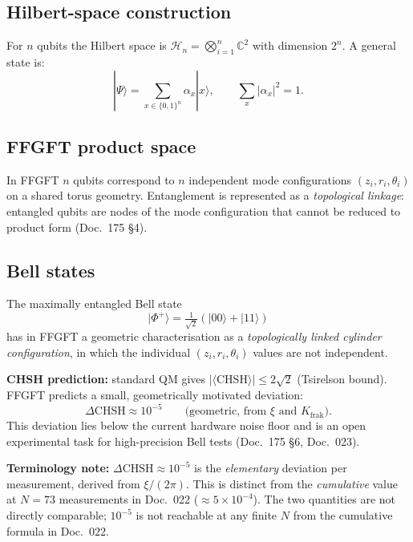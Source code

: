 \subsection{Hilbert-space construction}

For $n$ qubits the Hilbert space is
$\mathcal{H}_n = \bigotimes_{i=1}^{n} \mathbb{C}^2$ with dimension
$2^n$. A general state is:
\begin{equation}
  |\Psi\rangle = \sum_{x \in \{0,1\}^n} \alpha_x |x\rangle,
  \qquad
  \sum_x |\alpha_x|^2 = 1.
\end{equation}

\subsection{FFGFT product space}

In FFGFT $n$ qubits correspond to $n$ independent mode configurations
$(z_i, r_i, \theta_i)$ on a shared torus geometry. Entanglement is
represented as a \emph{topological linkage}: entangled qubits are
nodes of the mode configuration that cannot be reduced to product
form (Doc.~175 §4).

\subsection{Bell states}

The maximally entangled Bell state
\begin{equation}
  |\Phi^+\rangle = \tfrac{1}{\sqrt{2}}(|00\rangle + |11\rangle)
\end{equation}
has in FFGFT a geometric characterisation as a \emph{topologically
linked cylinder configuration}, in which the individual
$(z_i, r_i, \theta_i)$ values are not independent.

\textbf{CHSH prediction:} standard QM gives
$|\langle\text{CHSH}\rangle| \leq 2\sqrt{2}$ (Tsirelson bound).
FFGFT predicts a small, geometrically motivated deviation:
\begin{equation}
  \Delta\text{CHSH} \approx 10^{-5}
  \qquad\text{(geometric, from $\xi$ and $K_{\text{frak}}$)}.
\end{equation}
This deviation lies below the current hardware noise floor and is
an open experimental task for high-precision Bell tests
(Doc.~175 §6, Doc.~023).

\textbf{Terminology note:} $\Delta\text{CHSH} \approx 10^{-5}$ is the
\emph{elementary} deviation per measurement, derived from $\xi/(2\pi)$.
This is distinct from the \emph{cumulative} value at $N = 73$
measurements in Doc.~022 ($\approx 5 \times 10^{-4}$). The two
quantities are not directly comparable; $10^{-5}$ is not reachable
at any finite $N$ from the cumulative formula in Doc.~022.

